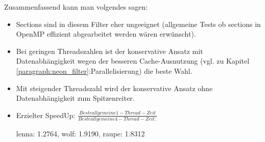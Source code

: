 Zusammenfassend kann man volgendes sagen:
\begin{itemize}
\item Sections sind in diesem Filter eher ungeeignet (allgemeine Tests ob sections in OpenMP effizient abgearbeitet werden wären erwünscht).
\item Bei geringen Threadszahlen ist der konservative Ansatz mit Datenabhängigkeit wegen der besseren Cache-Ausnutzung (vgl. zu Kapitel \ref{paragraph:neon_filter}:Parallelisierung) die beste Wahl.
\item Mit steigender Threadszahl wird der konservative Ansatz ohne Datenabhängigkeit zum Spitzenreiter.
\item Erzielter SpeedUp: $\frac{Beste allgemeine 1-Thread-Zeit}{Beste allgemeine 4-Thread-Zeit:}$

lenna: 1.2764, wolf: 1.9190, raupe: 1.8312
\end{itemize}

